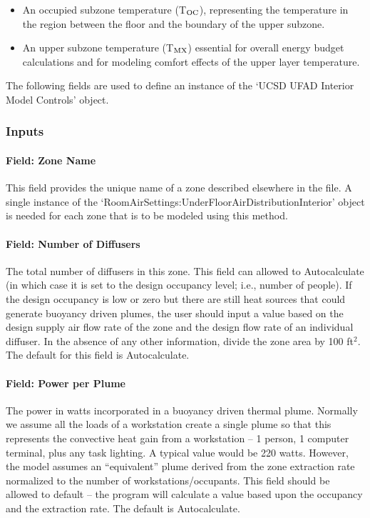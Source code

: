 \begin{itemize}
\item
  An occupied subzone temperature (T\(_{\rm{OC}}\)), representing the temperature in the region between the floor and the boundary of the upper subzone.
\item
  An upper subzone temperature (T\(_{\rm{MX}}\)) essential for overall energy budget calculations and for modeling comfort effects of the upper layer temperature.
\end{itemize}

The following fields are used to define an instance of the `UCSD UFAD Interior Model Controls' object.

\subsubsection{Inputs}\label{inputs-10-017}

\paragraph{Field: Zone Name}\label{field-zone-name-6-003}

This field provides the unique name of a zone described elsewhere in the file. A single instance of the `RoomAirSettings:UnderFloorAirDistributionInterior' object is needed for each zone that is to be modeled using this method.

\paragraph{Field: Number of Diffusers}\label{field-number-of-diffusers}

The total number of diffusers in this zone. This field can allowed to Autocalculate (in which case it is set to the design occupancy level; i.e., number of people). If the design occupancy is low or zero but there are still heat sources that could generate buoyancy driven plumes, the user should input a value based on the design supply air flow rate of the zone and the design flow rate of an individual diffuser. In the absence of any other information, divide the zone area by 100 ft\(^{2}\). The default for this field is Autocalculate.

\paragraph{Field: Power per Plume}\label{field-power-per-plume}

The power in watts incorporated in a buoyancy driven thermal plume. Normally we assume all the loads of a workstation create a single plume so that this represents the convective heat gain from a workstation -- 1 person, 1 computer terminal, plus any task lighting. A typical value would be 220 watts. However, the model assumes an ``equivalent'' plume derived from the zone extraction rate normalized to the number of workstations/occupants. This field should be allowed to default -- the program will calculate a value based upon the occupancy and the extraction rate. The default is Autocalculate.

